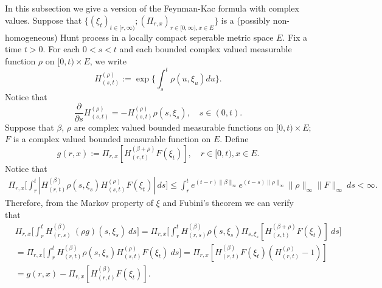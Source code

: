 \documentclass[12pt]{amsart}
\theoremstyle{plain}
\theoremstyle{definition}
\numberwithin{equation}{section}
\begin{document}
\subsection{}
\label{seq: complex Feynman-Kac transform}
    In this subsection we give a version of the Feynman-Kac formula with complex values.
    Suppose that $\{(\xi_t)_{t \in [r,\infty)}; (\Pi_{r,x})_{r\in [0,\infty), x\in E}\}$ is a (possibly non-homogeneous) Hunt process in a locally compact seperable metric space $E$.
    Fix a time $t >0$.
    For each $0< s< t$ and each bounded complex valued measurable function $\rho$ on $[0,t) \times E$, we write
\begin{equation}
    H^{(\rho)}_{(s,t)}:= \exp\Big\{\int_s^t \rho(u,\xi_u) du\Big\}.
\end{equation}
    Notice that
\begin{equation}
\label{eq: crucial for Feynman-Kac}
    \frac{\partial}{\partial s} H^{(\rho)}_{(s,t)}= -H^{(\rho)}_{(s,t)}\rho(s,\xi_s),
    \quad s\in (0,t).
\end{equation}
    Suppose that $\beta$, $\rho$ are complex valued bounded measurable functions on $[0,t) \times E$; $F$ is a complex valued bounded measurable function on $E$.
    Define
\begin{equation}
    g(r,x) := \Pi_{r,x}[ H_{(r,t)}^{(\beta+\rho)} F(\xi_t)],\quad r \in [0,t), x\in E.
\end{equation}
    Notice that
\begin{align}
    \Pi_{r,x} \Big[ \int_r^t | H_{(r,t)}^{(\beta)}\rho(s,\xi_s) H_{(s,t)}^{(\rho)} F(\xi_t)| ~ds \Big]
    \leq  \int_r^t e^{(t-r)\|\beta\|_\infty}e^{(t-s)\|\rho\|_\infty}\|\rho\|_\infty\|F\|_\infty ~ds
    < \infty.
\end{align}
    Therefore, from the Markov property of $\xi$ and Fubini's theorem we can verify that
\begin{align}
    &\Pi_{r,x} \Big[ \int_r^tH_{(r,s)}^{(\beta)}~(\rho g)(s,\xi_s)~ds \Big]
    =\Pi_{r,x} \Big[ \int_r^t H_{(r,s)}^{(\beta)}\rho(s,\xi_s) \Pi_{s,\xi_s}[ H_{(s,t)}^{(\beta+\rho)} F(\xi_t)]~ds \Big]
    \\&= \Pi_{r,x} \Big[ \int_r^t H_{(r,t)}^{(\beta)}\rho(s,\xi_s) H_{(s,t)}^{(\rho)} F(\xi_t) ~ds \Big]
    = \Pi_{r,x} [ H_{(r,t)}^{(\beta)}F(\xi_t)(H_{(r,t)}^{(\rho)} - 1)]
    \\&= g(r,x) - \Pi_{r,x} [ H_{(r,t)}^{(\beta)} F(\xi_t)].
\end{align}
\end{document}
